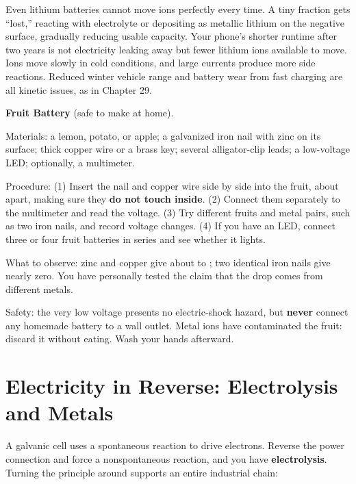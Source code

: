 Even lithium batteries cannot move ions perfectly every time. A tiny fraction gets ``lost,'' reacting with electrolyte or depositing as metallic lithium on the negative surface, gradually reducing usable capacity. Your phone's shorter runtime after two years is not electricity leaking away but fewer lithium ions available to move. Ions move slowly in cold conditions, and large currents produce more side reactions. Reduced winter vehicle range and battery wear from fast charging are all kinetic issues, as in Chapter 29.

\begin{shiyan}
\textbf{Fruit Battery} (safe to make at home).

Materials: a lemon, potato, or apple; a galvanized iron nail with zinc on its surface; thick copper wire or a brass key; several alligator-clip leads; a low-voltage LED; optionally, a multimeter.

Procedure: (1) Insert the nail and copper wire side by side into the fruit, about  apart, making sure they \textbf{do not touch inside}. (2) Connect them separately to the multimeter and read the voltage. (3) Try different fruits and metal pairs, such as two iron nails, and record voltage changes. (4) If you have an LED, connect three or four fruit batteries in series and see whether it lights.

What to observe: zinc and copper give about  to ; two identical iron nails give nearly zero. You have personally tested the claim that the drop comes from different metals.

Safety: the very low voltage presents no electric-shock hazard, but \textbf{never} connect any homemade battery to a wall outlet. Metal ions have contaminated the fruit: discard it without eating. Wash your hands afterward.
\end{shiyan}

\section{Electricity in Reverse: Electrolysis and Metals}

A galvanic cell uses a spontaneous reaction to drive electrons. Reverse the power connection and force a nonspontaneous reaction, and you have \textbf{electrolysis}. Turning the principle around supports an entire industrial chain:

